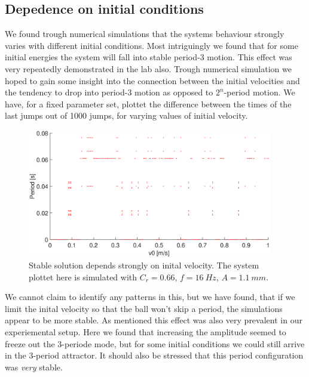 \documentclass[12pt,oneside,a4paper]{article}
\numberwithin{equation}{section}
\begin{document}
{{{{\subsection{Depedence on initial conditions}
We found trough numerical simulations that the systems behaviour strongly varies with different initial conditions. Most intriguingly we found that for some initial energies the system will fall into stable period-3 motion. This effect was very repeatedly demonstrated in the lab also. Trough numerical simulation we hoped to gain some insight into the connection between the initial velocities and the tendency to drop into period-3 motion as opposed to $2^n$-period motion. We have, for a fixed parameter set, plottet the difference between the times of the last jumps out of 1000 jumps, for varying values of initial velocity. 
\begin{figure}[h!]
\centering
\includegraphics[width=0.95\textwidth]{vsweep.eps}
\caption{Stable solution depends strongly on inital velocity. The system plottet here is simulated with $C_r=0.66$, $f=\SI{16}{Hz}$, $A=\SI{1.1}{mm}$.}
\end{figure}
We cannot claim to identify any patterns in this, but we have found, that if we limit the inital velocity so that the ball won't skip a period, the simulations appear to be more stable. As mentioned this effect was also very prevalent in our experiemental setup. Here we found that increasing the amplitude seemed to freeze out the 3-periode mode, but for some initial conditions we could still arrive in the 3-period attractor. It should also be stressed that this period configuration was \emph{very} stable. 
\newpage



\newpage
\appendix
}}}}
\end{document}
